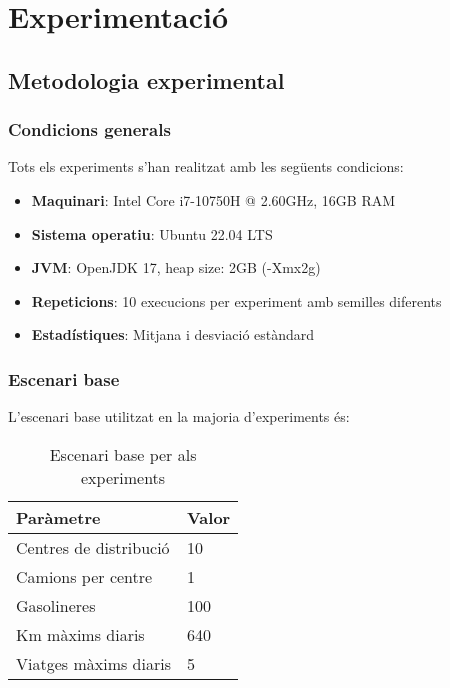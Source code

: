 \section{Experimentació}
\label{sec:experiments}

\subsection{Metodologia experimental}

\subsubsection{Condicions generals}

Tots els experiments s'han realitzat amb les següents condicions:

\begin{itemize}
    \item \textbf{Maquinari}: Intel Core i7-10750H @ 2.60GHz, 16GB RAM
    \item \textbf{Sistema operatiu}: Ubuntu 22.04 LTS
    \item \textbf{JVM}: OpenJDK 17, heap size: 2GB (-Xmx2g)
    \item \textbf{Repeticions}: 10 execucions per experiment amb semilles diferents
    \item \textbf{Estadístiques}: Mitjana i desviació estàndard
\end{itemize}

\subsubsection{Escenari base}

L'escenari base utilitzat en la majoria d'experiments és:

\begin{table}[H]
\centering
\begin{tabular}{@{}ll@{}}
\toprule
\textbf{Paràmetre} & \textbf{Valor} \\
\midrule
Centres de distribució & 10 \\
Camions per centre & 1 \\
Gasolineres & 100 \\
Km màxims diaris & 640 \\
Viatges màxims diaris & 5 \\
\bottomrule
\end{tabular}
\caption{Escenari base per als experiments}
\label{tab:escenari-base}
\end{table}








